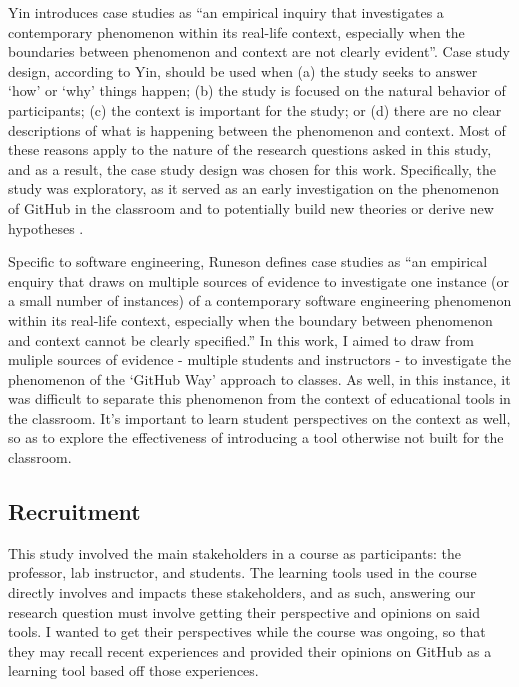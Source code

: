 Yin \cite{yin2013case} introduces case studies as ``an empirical inquiry that investigates a contemporary phenomenon within its real-life context, especially when the boundaries between phenomenon and context are not clearly evident''. Case study design, according to Yin, should be used when (a) the study seeks to answer `how' or `why' things happen; (b) the study is focused on the natural behavior of participants; (c) the context is important for the study; or (d) there are no clear descriptions of what is happening between the phenomenon and context. Most of these reasons apply to the nature of the research questions asked in this study, and as a result, the case study design was chosen for this work. Specifically, the study was exploratory, as it served as an early investigation on the phenomenon of GitHub in the classroom and to potentially build new theories or derive new hypotheses \cite{easterbrook2008selecting}.

Specific to software engineering, Runeson \cite{runeson2012case} defines case studies as ``an empirical enquiry that draws on multiple sources of evidence to investigate one instance (or a small number of instances) of a contemporary software engineering phenomenon within its real-life context, especially when the boundary between phenomenon and context cannot be clearly specified.'' In this work, I aimed to draw from muliple sources of evidence - multiple students and instructors - to investigate the phenomenon of the `GitHub Way' approach to classes. As well, in this instance, it was difficult to separate this phenomenon from the context of educational tools in the classroom. It's important to learn student perspectives on the context as well, so as to explore the effectiveness of introducing a tool otherwise not built for the classroom.

\subsection{Recruitment}
This study involved the main stakeholders in a course as participants: the professor, lab instructor, and students. The learning tools used in the course directly involves and impacts these stakeholders, and as such, answering our research question must involve getting their perspective and opinions on said tools. I wanted to get their perspectives while the course was ongoing, so that they may recall recent experiences and provided their opinions on GitHub as a learning tool based off those experiences.


